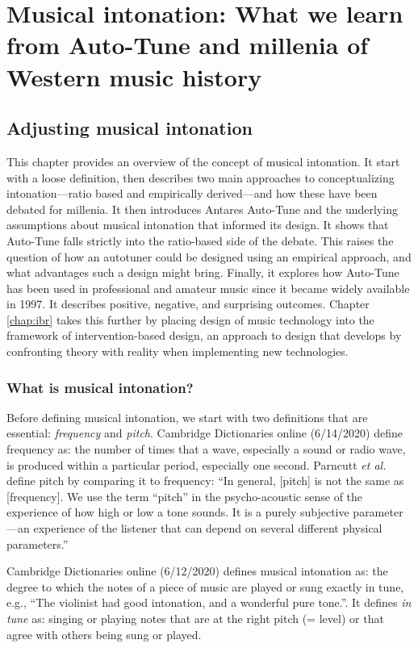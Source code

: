 \chapter{Musical intonation: What we learn from Auto-Tune and millenia of Western music history}

\section{Adjusting musical intonation}
This chapter provides an overview of the concept of musical intonation. It start with a loose definition, then describes two main approaches to conceptualizing intonation---ratio based and empirically derived---and how these have been debated for millenia. It then introduces Antares Auto-Tune and the underlying assumptions about musical intonation that informed its design. It shows that Auto-Tune falls strictly into the ratio-based side of the debate. This raises the question of how an autotuner could be designed using an empirical approach, and what advantages such a design might bring. Finally, it explores how Auto-Tune has been used in professional and amateur music since it became widely available in 1997. It describes positive, negative, and surprising outcomes. Chapter \ref{chap:ibr} takes this further by placing design of music technology into the framework of intervention-based design, an approach to design that develops by confronting theory with reality when implementing new technologies.

\subsection{What is musical intonation?}
Before defining musical intonation, we start with two definitions that are essential: \textit{frequency} and \textit{pitch}. Cambridge Dictionaries online (6/14/2020) define frequency as: the number of times that a wave, especially a sound or radio wave, is produced within a particular period, especially one second. Parncutt \textit{et al.} define pitch by comparing it to frequency: ``In general, [pitch] is not the same as [frequency]. We use the term ``pitch'' in the psycho-acoustic sense of the experience of how high or low a tone sounds. It is a purely subjective parameter---an experience of the listener that can depend on several different physical parameters.'' \cite{parncutt2018psychocultural}

Cambridge Dictionaries online (6/12/2020) defines musical intonation as: the degree to which the notes of a piece of music are played or sung exactly in  tune,  e.g.,  ``The  violinist  had  good  intonation,  and a wonderful pure tone.''. It defines \textit{in tune} as: singing or playing notes that are at the right pitch (= level) or that agree with others being sung or played. 

